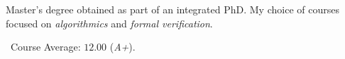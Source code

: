 Master's degree obtained as part of an integrated PhD. My choice of courses
focused on \emph{algorithmics} and \emph{formal verification}.

\medskip

\faFileO\ Course Average: $12.00$ (\emph{A+}).
